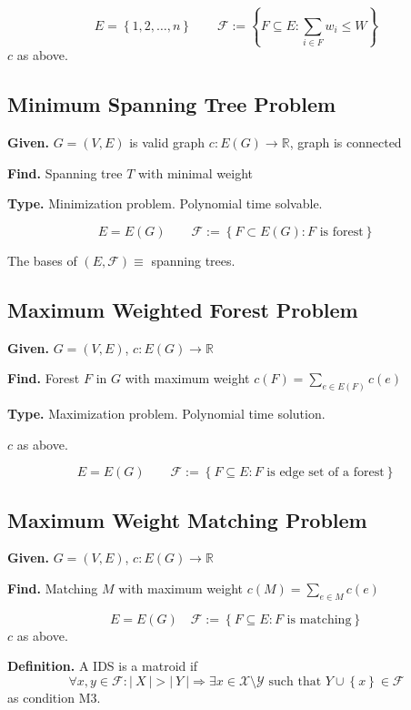 \documentclass{article}
\newcommand{\card}[1]{\left|\:\!#1\:\!\right|}
\newcommand{\set}[1]{\left\{#1\right\}}
\newcommand{\given}[1]{\textbf{Given.} #1\par}
\newcommand{\find}[1]{\textbf{Find.} #1\par}
\begin{document}
\[
  E = \set{1, 2, \ldots, n} \qquad
  \mathcal{F} := \set{F \subseteq E: \sum_{i \in F} w_i \leq W}
\]
$c$ as above.

\subsection{Minimum Spanning Tree Problem}
\given{$G = (V, E)$ is valid graph $c: E(G) \rightarrow \mathbb{R}$, graph is connected}
\find{Spanning tree $T$ with minimal weight}
\textbf{Type.} Minimization problem. Polynomial time solvable.\par

\[ E = E(G) \qquad \mathcal{F} := \set{F \subset E(G): F \text{ is forest}} \]

The bases of $(E, \mathcal{F}) \equiv$ spanning trees.

\subsection{Maximum Weighted Forest Problem}
%
\given{$G = (V, E)$, $c: E(G) \rightarrow \mathbb{R}$}
\find{Forest $F$ in $G$ with maximum weight $c(F) = \sum_{e \in E(F)} c(e)$}
\textbf{Type.} Maximization problem. Polynomial time solution.\par

$c$ as above.

\[
  E = E(G) \qquad \mathcal{F} := \set{F \subseteq E: F \text{ is edge set of a forest}}
\]

\subsection{Maximum Weight Matching Problem}
%
\given{$G = (V, E)$, $c: E(G) \rightarrow \mathbb{R}$}
\find{Matching $M$ with maximum weight $c(M) = \sum_{e \in M} c(e)$}

\[
  E = E(G) \quad
  \mathcal{F} := \set{F \subseteq E: F \text{ is matching}}
\]
$c$ as above.

\textbf{Definition.}
  A IDS is a matroid if
  \[
    \forall x, y \in \mathcal{F}: \card{X} > \card{Y}
    \Rightarrow \exists x \in \mathcal{X} \setminus \mathcal{Y}
      \text{ such that } Y \cup \set{x} \in \mathcal{F}
  \]
  as condition M3.
\end{document}
